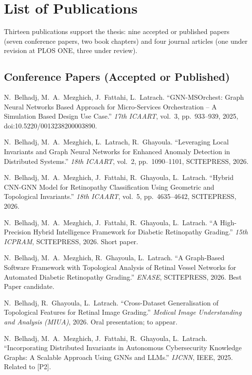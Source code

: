 \chapter*{List of Publications}
\label{ch:pubs}

Thirteen publications support the thesis: nine accepted or published papers (seven
conference papers, two book chapters) and four journal articles (one under revision at PLOS ONE, three under review).

\section*{Conference Papers (Accepted or Published)}

\begin{description}[style=sameline,leftmargin=3.2em,labelwidth=2.6em,itemsep=1pt]
\item[{[P1]}] N.~Belhadj, M.~A.~Mezghich, J.~Fattahi, L.~Latrach. ``GNN-MSOrchest: Graph
Neural Networks Based Approach for Micro-Services Orchestration -- A Simulation Based Design
Use Case.'' \emph{17th ICAART}, vol.~3, pp.~933--939, 2025, doi:10.5220/0013238200003890.
\item[{[P2]}] N.~Belhadj, M.~A.~Mezghich, L.~Latrach, R.~Ghayoula. ``Leveraging Local
Invariants and Graph Neural Networks for Enhanced Anomaly Detection in Distributed
Systems.'' \emph{18th ICAART}, vol.~2, pp.~1090--1101, SCITEPRESS, 2026.
\item[{[P3]}] N.~Belhadj, M.~A.~Mezghich, J.~Fattahi, R.~Ghayoula, L.~Latrach. ``Hybrid
CNN-GNN Model for Retinopathy Classification Using Geometric and Topological Invariants.''
\emph{18th ICAART}, vol.~5, pp.~4635--4642, SCITEPRESS, 2026.
\item[{[P4]}] N.~Belhadj, M.~A.~Mezghich, J.~Fattahi, R.~Ghayoula, L.~Latrach. ``A
High-Precision Hybrid Intelligence Framework for Diabetic Retinopathy Grading.''
\emph{15th ICPRAM}, SCITEPRESS, 2026. Short paper.
\item[{[P5]}] N.~Belhadj, M.~A.~Mezghich, R.~Ghayoula, L.~Latrach. ``A Graph-Based
Software Framework with Topological Analysis of Retinal Vessel Networks for Automated
Diabetic Retinopathy Grading.'' \emph{ENASE}, SCITEPRESS, 2026. Best Paper candidate.
\item[{[P6]}] N.~Belhadj, R.~Ghayoula, L.~Latrach. ``Cross-Dataset Generalisation of
Topological Features for Retinal Image Grading.'' \emph{Medical Image Understanding and
Analysis (MIUA)}, 2026. Oral presentation; to appear.
\item[{[P7]}] N.~Belhadj, M.~A.~Mezghich, J.~Fattahi, R.~Ghayoula, L.~Latrach.
``Incorporating Distributed Invariants in Autonomous Cybersecurity Knowledge Graphs: A
Scalable Approach Using GNNs and LLMs.'' \emph{IJCNN}, IEEE, 2025. Related to [P2].
\end{description}

